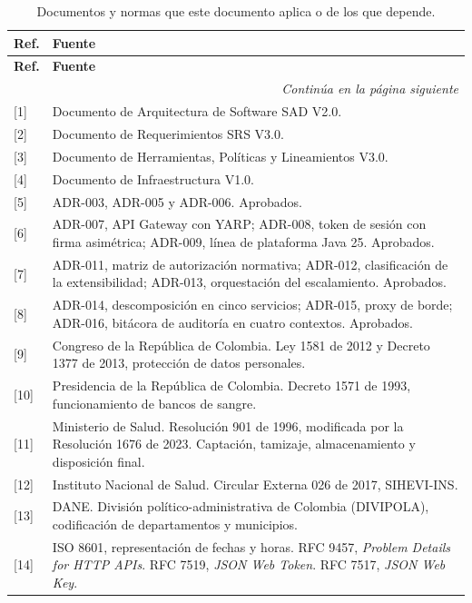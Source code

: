 \documentclass[11pt,a4paper]{article}
\newcommand{\contlinea}[1]{\multicolumn{#1}{r}{\footnotesize\itshape Continúa en la página siguiente}}
\begin{document}
\begin{longtable}{L{1.2cm} L{13.4cm}}
\caption{Documentos y normas que este documento aplica o de los que depende.}\label{tab:referencias}\\
\toprule
\textbf{Ref.} & \textbf{Fuente} \\
\midrule
\endfirsthead
\toprule
\textbf{Ref.} & \textbf{Fuente} \\
\midrule
\endhead
\midrule
\contlinea{2} \\
\endfoot
\bottomrule
\endlastfoot
{[}1{]} & Documento de Arquitectura de Software SAD V2.0. \\
{[}2{]} & Documento de Requerimientos SRS V3.0. \\
{[}3{]} & Documento de Herramientas, Políticas y Lineamientos V3.0. \\
{[}4{]} & Documento de Infraestructura V1.0. \\
{[}5{]} & ADR-003, ADR-005 y ADR-006. Aprobados. \\
{[}6{]} & ADR-007, API Gateway con YARP; ADR-008, token de sesión con firma asimétrica; ADR-009, línea de plataforma Java 25. Aprobados. \\
{[}7{]} & ADR-011, matriz de autorización normativa; ADR-012, clasificación de la extensibilidad; ADR-013, orquestación del escalamiento. Aprobados. \\
{[}8{]} & ADR-014, descomposición en cinco servicios; ADR-015, proxy de borde; ADR-016, bitácora de auditoría en cuatro contextos. Aprobados. \\
{[}9{]} & Congreso de la República de Colombia. Ley 1581 de 2012 y Decreto 1377 de 2013, protección de datos personales. \\
{[}10{]} & Presidencia de la República de Colombia. Decreto 1571 de 1993, funcionamiento de bancos de sangre. \\
{[}11{]} & Ministerio de Salud. Resolución 901 de 1996, modificada por la Resolución 1676 de 2023. Captación, tamizaje, almacenamiento y disposición final. \\
{[}12{]} & Instituto Nacional de Salud. Circular Externa 026 de 2017, SIHEVI-INS. \\
{[}13{]} & DANE. División político-administrativa de Colombia (DIVIPOLA), codificación de departamentos y municipios. \\
{[}14{]} & ISO 8601, representación de fechas y horas. RFC 9457, \emph{Problem Details for HTTP APIs}. RFC 7519, \emph{JSON Web Token}. RFC 7517, \emph{JSON Web Key}. \\
\end{longtable}
\end{document}

